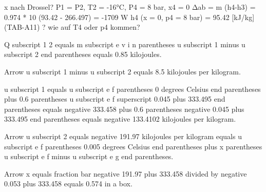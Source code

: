 x nach Drossel?
P1 = P2, T2 = -16°C, P4 = 8 bar, x4 = 0
Δab = m (h4-h3) = 0.974 * 10 (93.42 - 266.497) = -1709 W
h4 (x = 0, p4 = 8 bar) = 95.42 [kJ/kg] (TAB-A11)
? wie auf T4 oder p4 kommen?

Q subscript 1 2 equals m subscript e v i n parentheses u subscript 1 minus u subscript 2 end parentheses equals 0.85 kilojoules.

Arrow u subscript 1 minus u subscript 2 equals 8.5 kilojoules per kilogram.

u subscript 1 equals u subscript e f parentheses 0 degrees Celsius end parentheses plus 0.6 parentheses u subscript e f superscript 0.045 plus 333.495 end parentheses equals negative 333.458 plus 0.6 parentheses negative 0.045 plus 333.495 end parentheses equals negative 133.4102 kilojoules per kilogram.

Arrow u subscript 2 equals negative 191.97 kilojoules per kilogram equals u subscript e f parentheses 0.005 degrees Celsius end parentheses plus x parentheses u subscript e f minus u subscript e g end parentheses.

Arrow x equals fraction bar negative 191.97 plus 333.458 divided by negative 0.053 plus 333.458 equals 0.574 in a box.